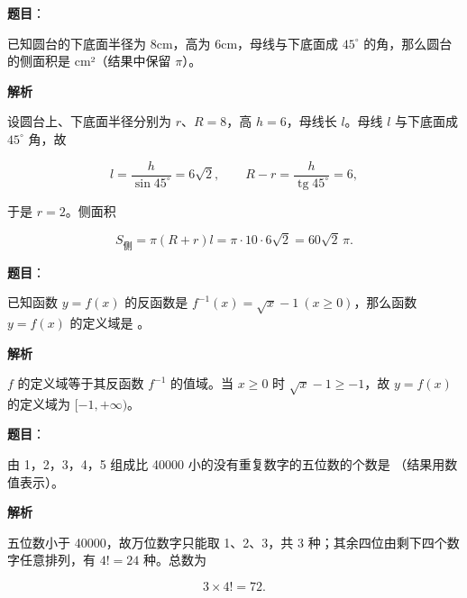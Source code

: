 \begin{answer}

\textbf{题目}：

已知圆台的下底面半径为 8cm，高为 6cm，母线与下底面成 $45^{\circ}$ 的角，那么圆台的侧面积是 \gkblank{} cm²（结果中保留 $\pi$）。

\textbf{解析}

设圆台上、下底面半径分别为 $r$、$R=8$，高 $h=6$，母线长 $l$。母线 $l$ 与下底面成 $45^{\circ}$ 角，故

\nopagebreak[4]
\[
l=\frac{h}{\sin 45^{\circ}}=6\sqrt{2},\qquad R-r=\frac{h}{\operatorname{tg}45^{\circ}}=6,
\]

于是 $r=2$。侧面积

\nopagebreak[4]
\[
S_{\text{侧}}=\pi(R+r)l=\pi\cdot 10\cdot 6\sqrt{2}=60\sqrt{2}\,\pi.
\]


\end{answer}
\begin{answer}

\textbf{题目}：

已知函数 $y=f(x)$ 的反函数是 $f^{-1}(x)=\sqrt{x}-1\ (x\ge 0)$，那么函数 $y=f(x)$ 的定义域是 \gkblank{}。

\textbf{解析}

$f$ 的定义域等于其反函数 $f^{-1}$ 的值域。当 $x\ge 0$ 时 $\sqrt{x}-1\ge -1$，故 $y=f(x)$ 的定义域为 $[-1,+\infty)$。

\gkanswer{答案：$[-1,+\infty)$。}

\end{answer}
\begin{answer}

\textbf{题目}：

由 1，2，3，4，5 组成比 40000 小的没有重复数字的五位数的个数是 \gkblank{}（结果用数值表示）。

\textbf{解析}

五位数小于 40000，故万位数字只能取 1、2、3，共 3 种；其余四位由剩下四个数字任意排列，有 $4!=24$ 种。总数为

\nopagebreak[4]
\[
3\times 4!=72.
\]


\end{answer}
